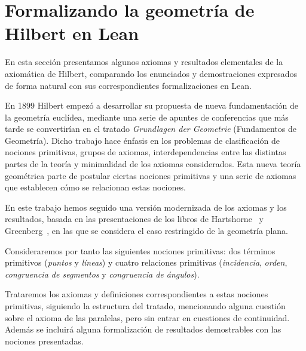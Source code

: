 \section{Formalizando la geometr\'{i}a de Hilbert en Lean}

En esta sección presentamos algunos axiomas y resultados elementales de la
axiomática de Hilbert, comparando los enunciados y demostraciones expresados de
forma natural con sus correspondientes formalizaciones en Lean.

En 1899 Hilbert empezó a desarrollar su propuesta de nueva fundamentación de la
geometría euclídea, mediante una serie de apuntes de conferencias que más tarde
se convertirían en el tratado \textit{Grundlagen der Geometrie} (Fundamentos de
Geometría). Dicho trabajo hace énfasis en los problemas de clasificación de
nociones primitivas, grupos de axiomas, interdependencias entre las distintas
partes de la teoría y minimalidad de los axiomas considerados. Esta nueva teoría
geométrica parte de postular ciertas nociones primitivas y una serie de axiomas
que establecen cómo se relacionan estas nociones.

En este trabajo hemos seguido una versión modernizada de los axiomas y los
resultados, basada en las presentaciones de los libros de
Hartshorne~\cite{hartshorneGeometryEuclid2000} y
Greenberg~\cite{greenbergEuclideanNonEuclideanGeometries1993}, en las que se
considera el caso restringido de la geometría plana.

Consideraremos por tanto las siguientes nociones primitivas: dos términos
primitivos (\textit{puntos} y \textit{líneas}) y cuatro relaciones primitivas
(\textit{incidencia}, \textit{orden}, \textit{congruencia de segmentos} y
\textit{congruencia de ángulos}).

Trataremos los axiomas y definiciones correspondientes a estas nociones
primitivas, siguiendo la estructura del tratado, mencionando alguna cuestión
sobre el axioma de las paralelas, pero sin entrar en cuestiones de continuidad.
Además se incluirá alguna formalización de resultados demostrables con las
nociones presentadas.

